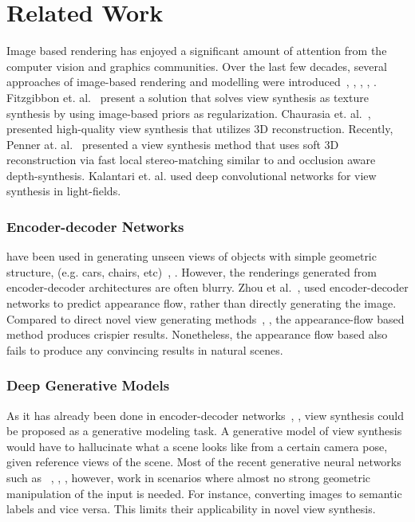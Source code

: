 \documentclass[runningheads]{llncs}
\begin{document}
\section{Related Work}
Image based rendering has enjoyed a significant amount of attention from the computer vision and graphics communities. Over the last few decades, several approaches of image-based rendering and modelling were introduced~\cite{chen_and_wiiliams}, \cite{seitz}, \cite{seitz2}, \cite{adelson1991plenoptic}, \cite{scharstein1996stereo}. Fitzgibbon et. al.~\cite{fitzgibbon2005image} present a solution that solves view synthesis as texture synthesis by using image-based priors as regularization. Chaurasia et. al.~\cite{chaurasia2013depth}, presented high-quality view synthesis that utilizes 3D reconstruction. Recently, Penner at. al.~\cite{penner2017soft} presented a view synthesis method that uses soft 3D reconstruction via fast local stereo-matching similar to \cite{hosni2011real} and occlusion aware depth-synthesis. Kalantari et. al. \cite{kalantari2016learning} used deep convolutional networks for view synthesis in light-fields.
\newline
\subsubsection*{Encoder-decoder Networks} have been used in generating unseen views of objects with simple geometric structure, (e.g. cars, chairs, etc)~\cite{tatarchenko2016multi}, \cite{dosovitskiy2015learning}. 
However, the renderings generated from encoder-decoder architectures are often blurry. Zhou et al.~\cite{zhou2016view}, used encoder-decoder networks to predict appearance flow, rather than directly generating the image. Compared to direct novel view generating methods~\cite{tatarchenko2016multi}, \cite{dosovitskiy2015learning}, the appearance-flow based method produces crispier results. Nonetheless, the appearance flow based also fails to produce any convincing results in natural scenes.
\newline
\subsubsection*{Deep Generative Models} As it has already been done in encoder-decoder networks~\cite{dosovitskiy2015learning}, \cite{tatarchenko2016multi}, view synthesis could be proposed as a generative modeling task. A generative model of view synthesis would have to hallucinate what a scene looks like from a certain camera pose, given reference views of the scene. Most of the recent generative neural networks such as ~\cite{isola}, \cite{pix2pixhd}, \cite{chen2017photographic}, however, work in scenarios where almost no strong geometric manipulation of the input is needed. For instance, converting images to semantic labels and vice versa. This limits their applicability in novel view synthesis.
\newline
\end{document}
